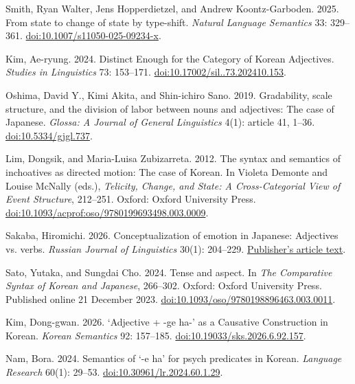 Smith, Ryan Walter, Jens Hopperdietzel, and Andrew Koontz-Garboden. 2025.
From state to change of state by type-shift.
\textit{Natural Language Semantics} 33: 329--361.
\href{https://doi.org/10.1007/s11050-025-09234-x}{doi:10.1007/s11050-025-09234-x}.

Kim, Ae-ryung. 2024.
Distinct Enough for the Category of Korean Adjectives.
\textit{Studies in Linguistics} 73: 153--171.
\href{https://doi.org/10.17002/sil..73.202410.153}{doi:10.17002/sil..73.202410.153}.

Oshima, David Y., Kimi Akita, and Shin-ichiro Sano. 2019.
Gradability, scale structure, and the division of labor between nouns and
adjectives: The case of Japanese.
\textit{Glossa: A Journal of General Linguistics} 4(1): article 41, 1--36.
\href{https://doi.org/10.5334/gjgl.737}{doi:10.5334/gjgl.737}.

Lim, Dongsik, and Maria-Luisa Zubizarreta. 2012.
The syntax and semantics of inchoatives as directed motion: The case of Korean.
In Violeta Demonte and Louise McNally (eds.),
\textit{Telicity, Change, and State: A Cross-Categorial View of Event Structure},
212--251. Oxford: Oxford University Press.
\href{https://doi.org/10.1093/acprof:oso/9780199693498.003.0009}{doi:10.1093/acprof:oso/9780199693498.003.0009}.

Sakaba, Hiromichi. 2026.
Conceptualization of emotion in Japanese: Adjectives vs. verbs.
\textit{Russian Journal of Linguistics} 30(1): 204--229.
\href{https://journals.rudn.ru/linguistics/article/view/50072}{Publisher's article text}.

Sato, Yutaka, and Sungdai Cho. 2024.
Tense and aspect.
In \textit{The Comparative Syntax of Korean and Japanese}, 266--302.
Oxford: Oxford University Press. Published online 21 December 2023.
\href{https://doi.org/10.1093/oso/9780198896463.003.0011}{doi:10.1093/oso/9780198896463.003.0011}.

Kim, Dong-gwan. 2026.
`Adjective + -ge ha-' as a Causative Construction in Korean.
\textit{Korean Semantics} 92: 157--185.
\href{https://doi.org/10.19033/sks.2026.6.92.157}{doi:10.19033/sks.2026.6.92.157}.

Nam, Bora. 2024.
Semantics of `-e ha' for psych predicates in Korean.
\textit{Language Research} 60(1): 29--53.
\href{https://doi.org/10.30961/lr.2024.60.1.29}{doi:10.30961/lr.2024.60.1.29}.
